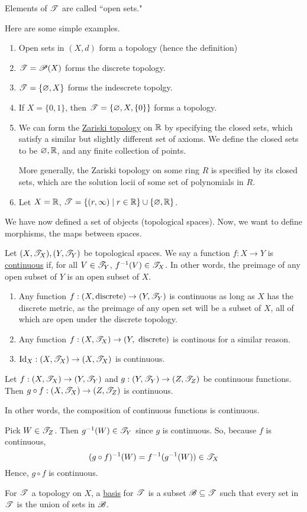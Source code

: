 \documentclass[x11names,reqno,14pt]{extarticle}
\newcommand*{\oo}{{\infty}}
\begin{document}
Elements of $\mathscr{T}$ are called ``open sets." 

\exm Here are some simple examples. 


\begin{enumerate}
\item Open sets in $(X, d)$ form a topology (hence the definition)
\item $\mathscr{T} = \mathscr{P}(X)$ forms the discrete topology. 
\item $\mathscr{T} = \{\varnothing, X\}$ forms the indescrete topolgy.
\item If $X = \{0, 1\}$, then $\mathscr{T} = \{\varnothing, X, \{0\}\}$ forms a topology. 
\item We can form the \underline{Zariski topology} on $\mathbb{R}$ by specifying the closed sets, which satisfy a similar but slightly different set of axioms. We define the closed sets to be $\varnothing, \mathbb{R}$, and any finite collection of points. 

More generally, the Zariski topology on some ring $R$ is specified by its closed sets, which are the solution locii of some set of polynomials in $R$. 
\item Let $X = \mathbb{R}$, $\ms{T} = \{(r, \oo)\mid r\in\R\} \cup \{\varnothing, \R\}$. 
\end{enumerate}

We have now defined a set of objects (topological spaces). Now, we want to define morphisms, the maps between spaces. 

 Let $(X, \mathscr{T}_X), (Y, \mathscr{T}_Y)$ be topological spaces. We say a function $f:X\to Y$ is \underline{continuous} if, for all $V\in\mathscr{T}_Y$, $f^{-1}(V) \in \mathscr{T}_X$. In other words, the preimage of any open subset of $Y$ is an open subset of $X$. 

\exm

\begin{enumerate} Some baby examples
\item Any function $f:(X, \text{discrete})\to (Y, \mathscr{T}_Y)$ is continuous as long as $X$ has the discrete metric, as the preimage of any open set will be a subset of $X$, all of which are open under the discrete topology. 
\item Any function $f:(X,\mathscr{T}_X)\to(Y,\text{ discrete})$ is continous for a similar reason. 
\item $\operatorname{\mathrm{Id}}_X:(X, \mathscr{T}_X)\to(X,\mathscr{T}_X)$ is continuous. 
\end{enumerate}

\thm 

Let $f:(X,\mathscr{T}_X)\to(Y,\mathscr{T}_Y)$ and $g:(Y,\mathscr{T}_Y)\to(Z,\mathscr{T}_Z)$ be continuous functions. Then $g \circ f:(X,\mathscr{T}_X)\to(Z,\mathscr{T}_Z)$ is continuous. 

In other words, the composition of continuous functions is continuous. 

\proof

Pick $W \in \mathscr{T}_Z$. Then $g^{-1}(W) \in \mathscr{T}_Y$ since $g$ is continuous. So, because $f$ is continuous, 
\[
(g\circ f)^{-1}(W) = f^{-1}(g^{-1}(W)) \in\mathscr{T}_X
\]
Hence, $g \circ f$ is continuous. 


For $\mathscr{T}$ a topology on $X$, a \underline{basis} for $\mathscr{T}$ is a subset $\mathscr{B}\subseteq\mathscr{T}$ such that every set in $\mathscr{T}$ is the union of sets in $\mathscr{B}$. 
\end{document}
